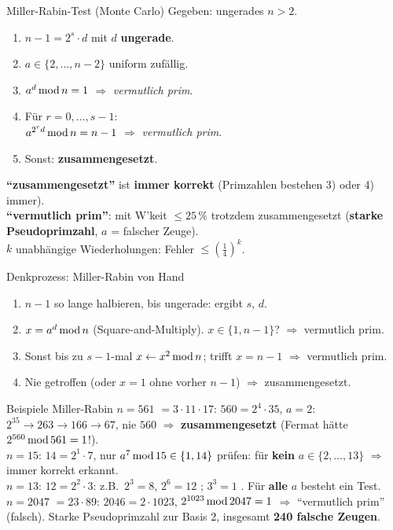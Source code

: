 \documentclass[a4paper, fontsize=7pt]{scrartcl}
\newcommand{\Mod}{\mskip3mu\mathrm{mod}\mskip3mu}
\begin{document}
\begin{mainbox}{Miller-Rabin-Test (Monte Carlo)}
Gegeben: ungerades $n > 2$.
\begin{enumerate}
    \item $n - 1 = 2^s \cdot d$ mit $d$ \textbf{ungerade}.
    \item $a \in \{2, \ldots, n - 2\}$ uniform zufällig.
    \item $a^d \Mod n = 1$ $\Rightarrow$ \emph{vermutlich prim}.
    \item Für $r = 0, \ldots, s - 1$:\\
          $a^{2^r d} \Mod n = n - 1$ $\Rightarrow$ \emph{vermutlich prim}.
    \item Sonst: \textbf{zusammengesetzt}.
\end{enumerate}
\textbf{``zusammengesetzt''} ist \textbf{immer korrekt} (Primzahlen bestehen
3) oder 4) immer).\\
\textbf{``vermutlich prim''}: mit W'keit $\le 25\,\%$ trotzdem
zusammengesetzt (\textbf{starke Pseudoprimzahl}, $a$ = falscher Zeuge).\\
$k$ unabhängige Wiederholungen: Fehler $\le \left(\frac{1}{4}\right)^k$.
\end{mainbox}

\begin{subbox}{Denkprozess: Miller-Rabin von Hand}
\begin{enumerate}
    \item $n - 1$ so lange halbieren, bis ungerade: ergibt $s$, $d$.
    \item $x = a^d \Mod n$ (Square-and-Multiply). $x \in \{1, n-1\}$?
          $\Rightarrow$ vermutlich prim.
    \item Sonst bis zu $s - 1$-mal $x \gets x^2 \Mod n$; trifft $x = n - 1$
          $\Rightarrow$ vermutlich prim.
    \item Nie getroffen (oder $x = 1$ ohne vorher $n - 1$)
          $\Rightarrow$ zusammengesetzt.
\end{enumerate}
\end{subbox}

\begin{subbox}{Beispiele Miller-Rabin}
\textbf{$n = 561$} $= 3 \cdot 11 \cdot 17$: $560 = 2^4 \cdot 35$, $a = 2$:\\
$2^{35} \to 263 \to 166 \to 67$, nie $560$ $\Rightarrow$
\textbf{zusammengesetzt} (Fermat hätte $2^{560} \Mod 561 = 1$!).\\[2pt]
\textbf{$n = 15$}: $14 = 2^1 \cdot 7$, nur $a^7 \Mod 15 \in \{1, 14\}$ prüfen:
für \textbf{kein} $a \in \{2, \ldots, 13\}$ $\Rightarrow$ immer korrekt
erkannt.\\[2pt]
\textbf{$n = 13$}: $12 = 2^2 \cdot 3$: z.B.\ $2^3 = 8$, $2^6 = 12$ \checkmark;
$3^3 = 1$ \checkmark. Für \textbf{alle} $a$ besteht ein Test.\\[2pt]
\textbf{$n = 2047$} $= 23 \cdot 89$: $2046 = 2 \cdot 1023$,
$2^{1023} \Mod 2047 = 1$ $\Rightarrow$ ``vermutlich prim'' (falsch).
Starke Pseudoprimzahl zur Basis 2, insgesamt \textbf{240 falsche Zeugen}.
\end{subbox}
\end{document}
